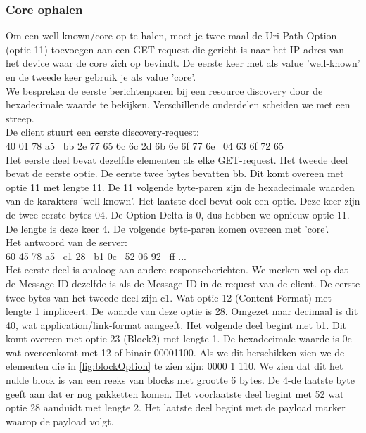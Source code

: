 \subsubsection{Core ophalen}
Om een well-known/core op te halen, moet je twee maal de Uri-Path Option (optie 11) toevoegen aan een GET-request die gericht is naar het IP-adres van het device waar de core zich op bevindt. De eerste keer met als value 'well-known' en de tweede keer gebruik je als value 'core'.\\

\noindent
We bespreken de eerste berichtenparen bij een resource discovery door de hexadecimale waarde te bekijken. Verschillende onderdelen scheiden we met een streep.\\

\noindent
De client stuurt een eerste discovery-request:\\
40 01 78 a5 \textbar~bb 2e 77 65 6c 6c 2d 6b 6e 6f 77 6e \textbar~04 63 6f 72 65\\
Het eerste deel bevat dezelfde elementen als elke GET-request. Het tweede deel bevat de eerste optie. De eerste twee bytes bevatten bb. Dit komt overeen met optie 11 met lengte 11. De 11 volgende byte-paren zijn de hexadecimale waarden van de karakters 'well-known'. Het laatste deel bevat ook een optie. Deze keer zijn de twee eerste bytes 04. De Option Delta is 0, dus hebben we opnieuw optie 11. De lengte is deze keer 4. De volgende byte-paren komen overeen met 'core'.\\

\noindent
Het antwoord van de server:\\
60 45 78 a5 \textbar~c1 28 \textbar~b1 0c \textbar~52 06 92 \textbar~ff ...\\
Het eerste deel is analoog aan andere responseberichten. We merken wel op dat de Message ID dezelfde is als de Message ID in de request van de client. De eerste twee bytes van het tweede deel zijn c1. Wat optie 12 (Content-Format) met lengte 1 impliceert. De waarde van deze optie is 28. Omgezet naar decimaal is dit 40, wat application/link-format aangeeft. Het volgende deel begint met b1. Dit komt overeen met optie 23 (Block2) met lengte 1. De hexadecimale waarde is 0c wat overeenkomt met 12 of binair 00001100. Als we dit herschikken zien we de elementen die in \ref{fig:blockOption} te zien zijn: 0000 1 110. We zien dat dit het nulde block is van een reeks van blocks met grootte 6 bytes. De 4-de laatste byte geeft aan dat er nog pakketten komen. Het voorlaatste deel begint met 52 wat optie 28 aanduidt met lengte 2. Het laatste deel begint met de payload marker waarop de payload volgt.\\

